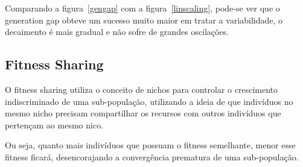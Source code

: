 \documentclass[12pt]{article}
\begin{document}
Comparando a figura~\ref{gengap} com a figura~\ref{linscaling}, pode-se ver que o 
generation gap obteve um sucesso muito maior em tratar a variabilidade, o decaimento 
é mais gradual e não sofre de grandes oscilações.

\subsection{Fitness Sharing}

O fitness sharing utiliza o conceito de nichos para controlar o crescimento indiscriminado 
de uma sub-população, utilizando a ideia de que indivíduos no mesmo nicho precisam 
compartilhar os recursos com outros indivíduos que pertençam ao mesmo nico.

Ou seja, quanto mais indivíduos que possuam o fitness semelhante, menor esse fitness 
ficará, desencorajando a convergência prematura de uma sub-população.
\end{document}
